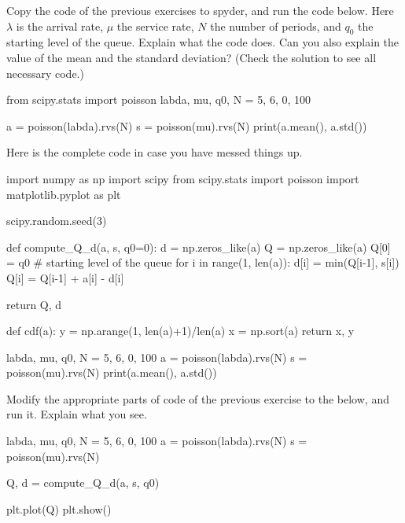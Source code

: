 \documentclass{scrartcl}
\begin{document}
\begin{exercise}
Copy the code of the previous exercises to spyder, and run the code below. Here $\lambda$ is the arrival rate, $\mu$ the service rate, $N$ the number of periods, and $q_0$ the starting level of the queue. Explain what the code does. Can you also explain the value of the mean and the standard deviation? (Check the solution to see all necessary code.) 

  \begin{pyverbatim}
from scipy.stats import poisson
labda, mu, q0, N = 5, 6, 0, 100

a = poisson(labda).rvs(N)
s = poisson(mu).rvs(N)
print(a.mean(), a.std())
\end{pyverbatim}
\begin{solution}
  Here is the complete code in case you have messed things up.

\begin{pyverbatim}
import numpy as np
import scipy
from scipy.stats import poisson
import matplotlib.pyplot as plt

scipy.random.seed(3) 


def compute_Q_d(a, s, q0=0):
    d = np.zeros_like(a)
    Q = np.zeros_like(a)
    Q[0] = q0 # starting level of the queue
    for i in range(1, len(a)):
        d[i] = min(Q[i-1], s[i])
        Q[i] = Q[i-1] + a[i] - d[i]

    return Q, d

def cdf(a):
    y = np.arange(1, len(a)+1)/len(a)
    x = np.sort(a)
    return x, y
  

labda, mu, q0, N = 5, 6, 0, 100
a = poisson(labda).rvs(N)
s = poisson(mu).rvs(N)
print(a.mean(), a.std())
\end{pyverbatim}

\end{solution}
\end{exercise}

\begin{exercise}
  Modify  the appropriate parts of  code of the previous exercise to the below,  and run it. Explain what you see.

  \begin{pyverbatim}
labda, mu, q0, N = 5, 6, 0, 100
a = poisson(labda).rvs(N)
s = poisson(mu).rvs(N)

Q, d = compute_Q_d(a, s, q0)

plt.plot(Q)
plt.show()
  \end{pyverbatim}
\end{exercise}
\end{document}
